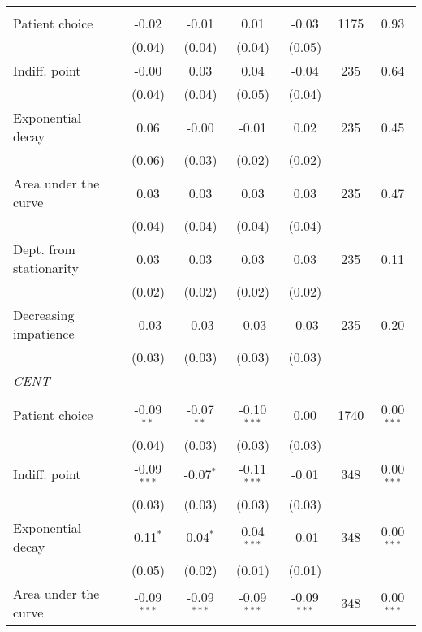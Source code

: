\begin{table}[htbp]
{\begin{threeparttable}
\begin{tabular}{l*{6}{c}}
          &         &         &         &         &         &         \\
Patient choice&    -0.02&    -0.01&     0.01&    -0.03&     1175&     0.93\\
          &   (0.04)&   (0.04)&   (0.04)&   (0.05)&         &         \\
Indiff. point&    -0.00&     0.03&     0.04&    -0.04&      235&     0.64\\
          &   (0.04)&   (0.04)&   (0.05)&   (0.04)&         &         \\
Exponential decay&     0.06&    -0.00&    -0.01&     0.02&      235&     0.45\\
          &   (0.06)&   (0.03)&   (0.02)&   (0.02)&         &         \\
Area under the curve&     0.03&     0.03&     0.03&     0.03&      235&     0.47\\
          &   (0.04)&   (0.04)&   (0.04)&   (0.04)&         &         \\
Dept. from stationarity&     0.03&     0.03&     0.03&     0.03&      235&     0.11\\
          &   (0.02)&   (0.02)&   (0.02)&   (0.02)&         &         \\
Decreasing impatience&    -0.03&    -0.03&    -0.03&    -0.03&      235&     0.20\\
          &   (0.03)&   (0.03)&   (0.03)&   (0.03)&         &         \\
\textit{CENT}&         &         &         &         &         &         \\
          &         &         &         &         &         &         \\
Patient choice&-0.09$^{**}$&-0.07$^{**}$&-0.10$^{***}$&     0.00&     1740&0.00$^{***}$\\
          &   (0.04)&   (0.03)&   (0.03)&   (0.03)&         &         \\
Indiff. point&-0.09$^{***}$&-0.07$^{*}$&-0.11$^{***}$&    -0.01&      348&0.00$^{***}$\\
          &   (0.03)&   (0.03)&   (0.03)&   (0.03)&         &         \\
Exponential decay&0.11$^{*}$&0.04$^{*}$&0.04$^{***}$&    -0.01&      348&0.00$^{***}$\\
          &   (0.05)&   (0.02)&   (0.01)&   (0.01)&         &         \\
Area under the curve&-0.09$^{***}$&-0.09$^{***}$&-0.09$^{***}$&-0.09$^{***}$&      348&0.00$^{***}$\\

\end{tabular}
\end{threeparttable}}
\end{table}

